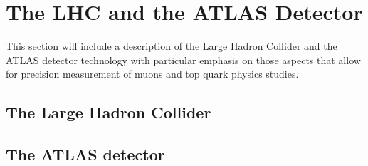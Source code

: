 \chapter{The LHC and the ATLAS Detector} \label{sec:lhc_atlas_detector}
This section will include a description of the Large Hadron Collider and the ATLAS detector
technology with particular emphasis on those aspects that allow for precision measurement
of muons and top quark physics studies.

\section{The Large Hadron Collider} \label{sec:the_large_hadron_collider}
\section{The ATLAS detector} \label{sec:the_atlas_detector}
